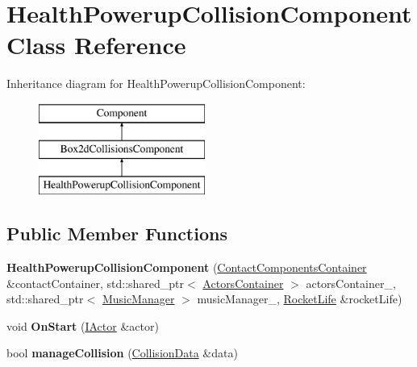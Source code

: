 \hypertarget{classHealthPowerupCollisionComponent}{}\section{Health\+Powerup\+Collision\+Component Class Reference}
\label{classHealthPowerupCollisionComponent}
Inheritance diagram for Health\+Powerup\+Collision\+Component\+:\begin{figure}[H]
\begin{center}
\leavevmode
\includegraphics[height=3.000000cm]{classHealthPowerupCollisionComponent}
\end{center}
\end{figure}
\subsection*{Public Member Functions}
\begin{DoxyCompactItemize}
\item 
{\bfseries Health\+Powerup\+Collision\+Component} (\hyperlink{classContactComponentsContainer}{Contact\+Components\+Container} \&contact\+Container, std\+::shared\+\_\+ptr$<$ \hyperlink{classActorsContainer}{Actors\+Container} $>$ actors\+Container\+\_\+, std\+::shared\+\_\+ptr$<$ \hyperlink{classMusicManager}{Music\+Manager} $>$ music\+Manager\+\_\+, \hyperlink{classRocketLife}{Rocket\+Life} \&rocket\+Life)\hypertarget{classHealthPowerupCollisionComponent_a84287dd35e8bcfe39803fb31ffee3d2c}{}\label{classHealthPowerupCollisionComponent_a84287dd35e8bcfe39803fb31ffee3d2c}

\item 
void {\bfseries On\+Start} (\hyperlink{classIActor}{I\+Actor} \&actor)\hypertarget{classHealthPowerupCollisionComponent_a725faf63e859ed147aa0d5f020d24669}{}\label{classHealthPowerupCollisionComponent_a725faf63e859ed147aa0d5f020d24669}

\item 
bool {\bfseries manage\+Collision} (\hyperlink{structCollisionData}{Collision\+Data} \&data)\hypertarget{classHealthPowerupCollisionComponent_a602eab6b9e69a0c7c0ffa49dbd552075}{}\label{classHealthPowerupCollisionComponent_a602eab6b9e69a0c7c0ffa49dbd552075}

\end{DoxyCompactItemize}
